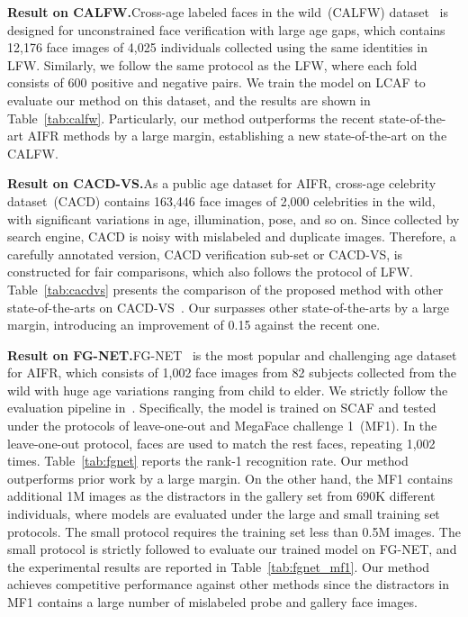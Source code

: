 \noindent\textbf{Result on CALFW.}\quad Cross-age labeled faces in the wild~(CALFW) dataset~\cite{zheng2017cross} is designed for unconstrained face verification with large age gaps, which contains 12,176 face images of 4,025 individuals collected using the same identities in LFW. Similarly, we follow the same protocol as the LFW, where each fold consists of 600 positive and negative pairs. We train the model on LCAF to evaluate our method on this dataset, and the results are shown in Table~\ref{tab:calfw}. Particularly, our method outperforms the recent state-of-the-art AIFR methods by a large margin, establishing a new state-of-the-art on the CALFW.

\noindent\textbf{Result on CACD-VS.}\quad As a public age dataset for AIFR, cross-age celebrity dataset~(CACD) contains 163,446 face images of 2,000 celebrities in the wild, with significant variations in age, illumination, pose, and so on. Since collected by search engine, CACD is noisy with mislabeled and duplicate images. Therefore, a carefully annotated version, CACD verification sub-set or CACD-VS, is constructed for fair comparisons, which also follows the protocol of LFW. Table~\ref{tab:cacdvs} presents the comparison of the proposed method with other state-of-the-arts on CACD-VS~\cite{chen2015face}. Our \methodname surpasses other state-of-the-arts by a large margin, introducing an improvement of 0.15 against the recent one.

\noindent\textbf{Result on FG-NET.}\quad FG-NET~\cite{fgnet} is the most popular and challenging age dataset for AIFR, which consists of 1,002 face images from 82 subjects collected from the wild with huge age variations ranging from child to elder. We strictly follow the evaluation pipeline in~\cite{wang2019decorrelated,wang2018orthogonal}. Specifically, the model is trained on SCAF and tested under the protocols of leave-one-out and MegaFace challenge 1~(MF1). In the leave-one-out protocol, faces are used to match the rest faces, repeating 1,002 times. Table~\ref{tab:fgnet} reports the rank-1 recognition rate. Our method outperforms prior work by a large margin. On the other hand, the MF1 contains additional 1M images as the distractors in the gallery set from 690K different individuals, where models are evaluated under the large and small training set protocols. The small protocol requires the training set less than 0.5M images. The small protocol is strictly followed to evaluate our trained model on FG-NET, and the experimental results are reported in Table~\ref{tab:fgnet_mf1}. Our method achieves competitive performance against other methods since the distractors in MF1 contains a large number of mislabeled probe and gallery face images.

